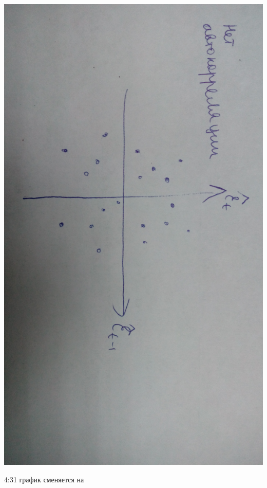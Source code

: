 \documentclass[12pt,a4paper]{article}
\begin{document}
\includegraphics[scale=0.05, angle=90]{autocorr_0.jpg} 

4:31 график сменяется на
\end{document}
